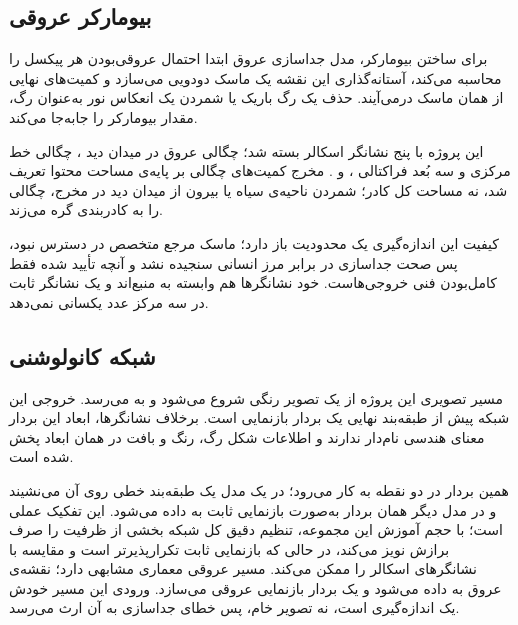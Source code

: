 \subsection{بیومارکر عروقی}

برای ساختن بیومارکر، مدل جداسازی عروق ابتدا احتمال عروقی‌بودن هر پیکسل را محاسبه می‌کند، آستانه‌گذاری این نقشه یک ماسک دودویی می‌سازد و کمیت‌های نهایی از همان ماسک درمی‌آیند. حذف یک رگ باریک یا شمردن یک انعکاس نور به‌عنوان رگ، مقدار بیومارکر را جابه‌جا می‌کند.

این پروژه با پنج نشانگر اسکالر بسته شد؛ چگالی عروق در میدان دید ، چگالی خط مرکزی  و سه بُعد فراکتالی ،  و . مخرج کمیت‌های چگالی بر پایه‌ی مساحت محتوا تعریف شد، نه مساحت کل کادر؛ شمردن ناحیه‌ی سیاه یا بیرون از میدان دید در مخرج، چگالی را به کادربندی گره می‌زند.

کیفیت این اندازه‌گیری یک محدودیت باز دارد؛ ماسک مرجع متخصص در دسترس نبود، پس صحت جداسازی در برابر مرز انسانی سنجیده نشد و آنچه تأیید شده فقط کامل‌بودن فنی خروجی‌هاست. خود نشانگرها هم وابسته به منبع‌اند و یک نشانگر ثابت در سه مرکز عدد یکسانی نمی‌دهد.

\subsection{شبکه کانولوشنی}

مسیر تصویری این پروژه از یک تصویر رنگی  شروع می‌شود و به  می‌رسد. خروجی این شبکه پیش از طبقه‌بند نهایی یک بردار بازنمایی است. برخلاف نشانگرها، ابعاد این بردار معنای هندسی نام‌دار ندارند و اطلاعات شکل رگ، رنگ و بافت در همان ابعاد پخش شده است.

همین بردار در دو نقطه به کار می‌رود؛ در یک مدل یک طبقه‌بند خطی روی آن می‌نشیند و در مدل دیگر همان بردار به‌صورت بازنمایی ثابت به  داده می‌شود. این تفکیک عملی است؛ با حجم آموزش این مجموعه، تنظیم دقیق کل شبکه بخشی از ظرفیت را صرف برازش نویز می‌کند، در حالی که بازنمایی ثابت تکرارپذیرتر است و مقایسه با نشانگرهای اسکالر را ممکن می‌کند. مسیر عروقی معماری مشابهی دارد؛ نقشه‌ی عروق به  داده می‌شود و یک بردار بازنمایی عروقی می‌سازد. ورودی این مسیر خودش یک اندازه‌گیری است، نه تصویر خام، پس خطای جداسازی به آن ارث می‌رسد.

